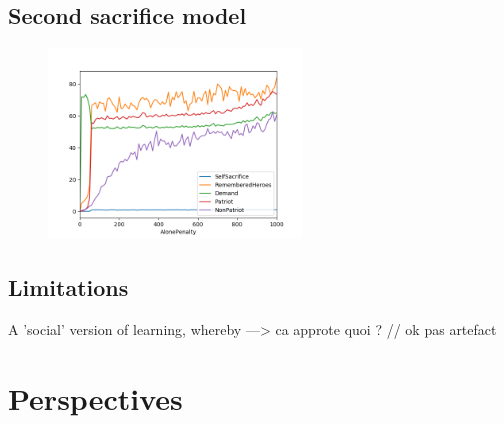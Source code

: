 \documentclass[a4paper,12pt]{report}
\begin{document}





\section{Second sacrifice model}



\begin{figure}[h]
    \centering
    \includegraphics[width=0.6\textwidth]{AP_allRGT_count20}
    \caption{}
    \label{fig:h}
    \end{figure}






\section{Limitations}

A 'social' version of learning, whereby ---> ca approte quoi ? // ok pas artefact



\chapter{Perspectives}

%
%
\end{document}
